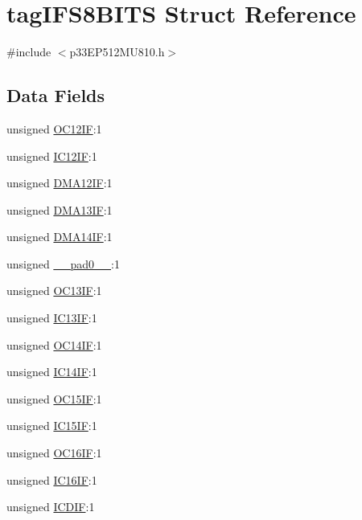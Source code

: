\hypertarget{structtag_i_f_s8_b_i_t_s}{}\section{tag\+I\+F\+S8\+B\+I\+TS Struct Reference}
\label{structtag_i_f_s8_b_i_t_s}


{\ttfamily \#include $<$p33\+E\+P512\+M\+U810.\+h$>$}

\subsection*{Data Fields}
\begin{DoxyCompactItemize}
\item 
unsigned \hyperlink{structtag_i_f_s8_b_i_t_s_aafec04ac48634f8fd035a8fa119980b0}{O\+C12\+IF}\+:1
\item 
unsigned \hyperlink{structtag_i_f_s8_b_i_t_s_afe2f6bf9cc2c848da5ac4679f81e9f50}{I\+C12\+IF}\+:1
\item 
unsigned \hyperlink{structtag_i_f_s8_b_i_t_s_a796fb64c286ad7cab60cf98fdee63d9e}{D\+M\+A12\+IF}\+:1
\item 
unsigned \hyperlink{structtag_i_f_s8_b_i_t_s_ada7fde0dca4fd1baa373fe19a832df2e}{D\+M\+A13\+IF}\+:1
\item 
unsigned \hyperlink{structtag_i_f_s8_b_i_t_s_ab681c7352cad8a9abad836688340f446}{D\+M\+A14\+IF}\+:1
\item 
unsigned \hyperlink{structtag_i_f_s8_b_i_t_s_adf71f3d8410c1f1dbbc96680a92c49af}{\+\_\+\+\_\+pad0\+\_\+\+\_\+}\+:1
\item 
unsigned \hyperlink{structtag_i_f_s8_b_i_t_s_a99f2a34720c49c76c5c787f2179d9908}{O\+C13\+IF}\+:1
\item 
unsigned \hyperlink{structtag_i_f_s8_b_i_t_s_af4846d0f3df9992d8c5f4b33437d563e}{I\+C13\+IF}\+:1
\item 
unsigned \hyperlink{structtag_i_f_s8_b_i_t_s_a5bd3289a7a703366a724d0c6b2c4f970}{O\+C14\+IF}\+:1
\item 
unsigned \hyperlink{structtag_i_f_s8_b_i_t_s_a60e894bc34797734d85b2813845f1b0f}{I\+C14\+IF}\+:1
\item 
unsigned \hyperlink{structtag_i_f_s8_b_i_t_s_a0643e058d83f47765866db177bbcb059}{O\+C15\+IF}\+:1
\item 
unsigned \hyperlink{structtag_i_f_s8_b_i_t_s_ad6cd03c5d79d1e7ffca33b04c34f783e}{I\+C15\+IF}\+:1
\item 
unsigned \hyperlink{structtag_i_f_s8_b_i_t_s_a3926b9ca60c7b177d7dfda25b6964a3a}{O\+C16\+IF}\+:1
\item 
unsigned \hyperlink{structtag_i_f_s8_b_i_t_s_a75c14a7ce74c8f53dfa4099d67e71a06}{I\+C16\+IF}\+:1
\item 
unsigned \hyperlink{structtag_i_f_s8_b_i_t_s_a501faaccdfbb399fbbf215070c715b39}{I\+C\+D\+IF}\+:1
\end{DoxyCompactItemize}


